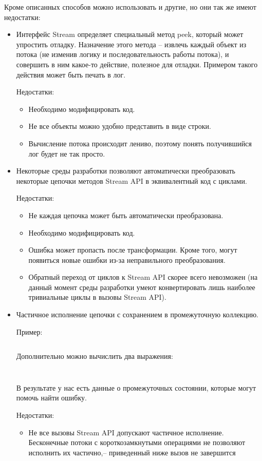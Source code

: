 Кроме описанных способов можно использовать и другие, но они так же имеют недостатки:
\begin{itemize}
	\item Интерфейс Stream определяет специальный метод peek, который может упростить отладку. Назначение этого метода -- извлечь каждый объект из потока (не изменив логику и последовательность работы потока), и совершить в ним какое-то действие, полезное для отладки. Примером такого действия может быть печать в лог. 
	
	Недостатки: 
	\begin{itemize}
		\item Необходимо модифицировать код.
		\item Не все объекты можно удобно представить в виде строки.
		\item Вычисление потока происходит лениво, поэтому понять получившийся лог будет не так просто.
	\end{itemize}

	\item Некоторые среды разработки позволяют автоматически преобразовать некоторые цепочки методов Stream API в эквивалентный код с циклами. 
	
	Недостатки:
	\begin{itemize}
		\item Не каждая цепочка может быть автоматически преобразована.
		\item Необходимо модифицировать код.
		\item Ошибка может пропасть после трансформации. Кроме того, могут появиться новые ошибки из-за неправильного преобразования.
		\item Обратный переход от циклов к Stream API скорее всего невозможен (на данный момент среды разработки умеют конвертировать лишь наиболее тривиальные циклы в вызовы Stream API).
	\end{itemize}
	
	\item Частичное исполнение цепочки с сохранением в промежуточную коллекцию.
	
	Пример: 
	\inputminted{java}{chapter1/code/PartialEvaluationFull.java}
	Дополнительно можно вычислить два выражения:
	\inputminted{java}{chapter1/code/PartialEvaluation1.java}
	\inputminted{java}{chapter1/code/PartialEvaluation2.java}
	В результате у нас есть данные о промежуточных состоянии, которые могут помочь найти ошибку.
	
	Недостатки:
	\begin{itemize}
		\item Не все вызовы Stream API допускают частичное исполнение. Бесконечные потоки с короткозамкнутыми операциями не позволяют исполнить их частично,-- приведенный ниже вызов не завершится
		

\end{itemize}
\end{itemize}
